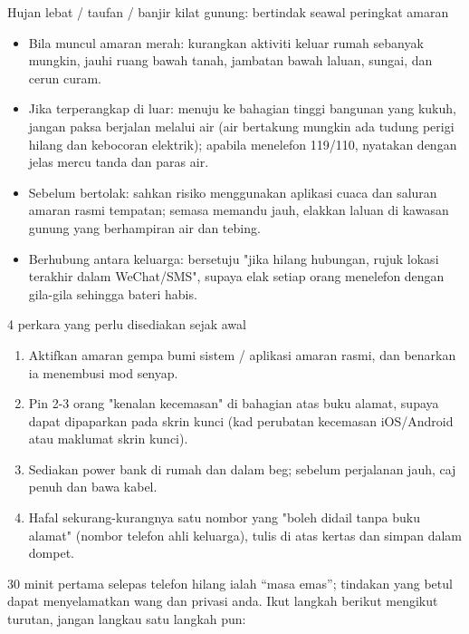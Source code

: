 \begin{tcbwarn}{Hujan lebat / taufan / banjir kilat gunung: bertindak seawal peringkat amaran}
\begin{itemize}
  \item Bila muncul amaran merah: kurangkan aktiviti keluar rumah sebanyak mungkin, jauhi ruang bawah tanah, jambatan bawah laluan, sungai, dan cerun curam.
  \item Jika terperangkap di luar: menuju ke bahagian tinggi bangunan yang kukuh, jangan paksa berjalan melalui air (air bertakung mungkin ada tudung perigi hilang dan kebocoran elektrik); apabila menelefon 119/110, nyatakan dengan jelas mercu tanda dan paras air.
  \item Sebelum bertolak: sahkan risiko menggunakan aplikasi cuaca dan saluran amaran rasmi tempatan; semasa memandu jauh, elakkan laluan di kawasan gunung yang berhampiran air dan tebing.
  \item Berhubung antara keluarga: bersetuju "jika hilang hubungan, rujuk lokasi terakhir dalam WeChat/SMS", supaya elak setiap orang menelefon dengan gila-gila sehingga bateri habis.
\end{itemize}

\end{tcbwarn}

\begin{tcbpractice}{4 perkara yang perlu disediakan sejak awal}
\begin{enumerate}
  \item Aktifkan amaran gempa bumi sistem / aplikasi amaran rasmi, dan benarkan ia menembusi mod senyap.
  \item Pin 2-3 orang "kenalan kecemasan" di bahagian atas buku alamat, supaya dapat dipaparkan pada skrin kunci (kad perubatan kecemasan iOS/Android atau maklumat skrin kunci).
  \item Sediakan power bank di rumah dan dalam beg; sebelum perjalanan jauh, caj penuh dan bawa kabel.
  \item Hafal sekurang-kurangnya satu nombor yang "boleh didail tanpa buku alamat" (nombor telefon ahli keluarga), tulis di atas kertas dan simpan dalam dompet.
\end{enumerate}

\end{tcbpractice}


30 minit pertama selepas telefon hilang ialah “masa emas”; tindakan yang betul dapat menyelamatkan wang dan privasi anda. Ikut langkah berikut mengikut turutan, jangan langkau satu langkah pun:

